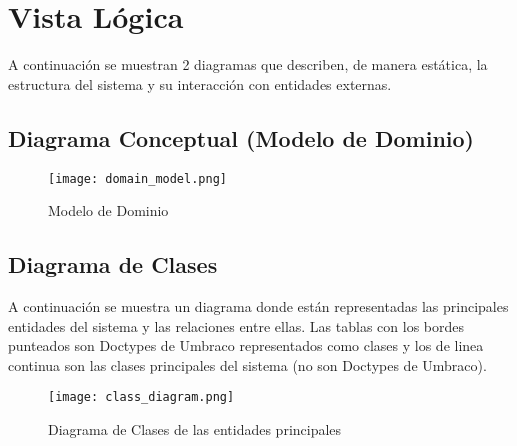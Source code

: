 \section{Vista Lógica} \label{vistaLogica}
A continuación se muestran 2 diagramas que describen, de manera estática, la estructura del sistema y su interacción con entidades externas.

\subsection{Diagrama Conceptual (Modelo de Dominio)}

\begin{figure}[H]
    \texttt{[image: domain\_model.png]}
    \caption{Modelo de Dominio}
    \label{fig:domain_model}
    \centering
\end{figure}

\subsection{Diagrama de Clases}
A continuación se muestra un diagrama donde están representadas las principales entidades del sistema y las relaciones entre ellas. Las tablas con los bordes punteados son Doctypes de Umbraco representados como clases y los de linea continua son las clases principales del sistema (no son Doctypes de Umbraco).

\begin{figure}[H]
    \texttt{[image: class\_diagram.png]}
    \caption{Diagrama de Clases de las entidades principales}
    \label{fig:class_diagram_main}
    \centering
\end{figure}